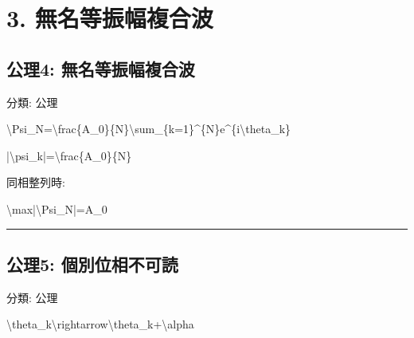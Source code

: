 \documentclass[
  a4paper,
]{ltjsarticle}
\newenvironment{Shaded}{}{}
\newcommand{\NormalTok}[1]{#1}
\begin{document}
\section{3.
無名等振幅複合波}\label{ux7121ux540dux7b49ux632fux5e45ux8907ux5408ux6ce2}

\subsection{公理4:
無名等振幅複合波}\label{ux516cux74064-ux7121ux540dux7b49ux632fux5e45ux8907ux5408ux6ce2}

分類: 公理

\begin{Shaded}
\begin{Highlighting}[]
\NormalTok{\textbackslash{}Psi\_N=\textbackslash{}frac\{A\_0\}\{N\}\textbackslash{}sum\_\{k=1\}\^{}\{N\}e\^{}\{i\textbackslash{}theta\_k\}}
\end{Highlighting}
\end{Shaded}

\begin{Shaded}
\begin{Highlighting}[]
\NormalTok{|\textbackslash{}psi\_k|=\textbackslash{}frac\{A\_0\}\{N\}}
\end{Highlighting}
\end{Shaded}

同相整列時:

\begin{Shaded}
\begin{Highlighting}[]
\NormalTok{\textbackslash{}max|\textbackslash{}Psi\_N|=A\_0}
\end{Highlighting}
\end{Shaded}

\begin{center}\rule{0.5\linewidth}{0.5pt}\end{center}

\subsection{公理5:
個別位相不可読}\label{ux516cux74065-ux500bux5225ux4f4dux76f8ux4e0dux53efux8aad}

分類: 公理

\begin{Shaded}
\begin{Highlighting}[]
\NormalTok{\textbackslash{}theta\_k\textbackslash{}rightarrow\textbackslash{}theta\_k+\textbackslash{}alpha}
\end{Highlighting}
\end{Shaded}
\end{document}
